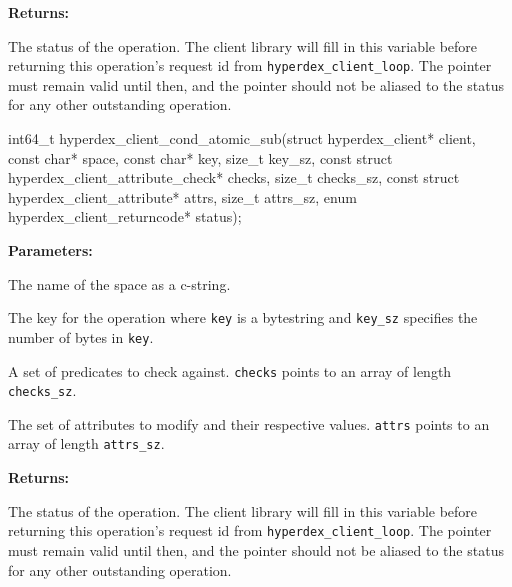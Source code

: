 \noindent\textbf{Returns:}
\begin{description}[labelindent=\widthof{{\texttt{status}}},leftmargin=*,noitemsep,nolistsep,align=right]
\item[\texttt{status}] The status of the operation.  The client library will fill in this variable before returning this operation's request id from \texttt{hyperdex\_client\_loop}.  The pointer must remain valid until then, and the pointer should not be aliased to the status for any other outstanding operation.
\end{description}

\funcsep
{}
\begin{ccode}
int64_t hyperdex_client_cond_atomic_sub(struct hyperdex_client* client,
                const char* space,
                const char* key, size_t key_sz,
                const struct hyperdex_client_attribute_check* checks, size_t checks_sz,
                const struct hyperdex_client_attribute* attrs, size_t attrs_sz,
                enum hyperdex_client_returncode* status);
\end{ccode}
\funcdesc 

\noindent\textbf{Parameters:}
\begin{description}[labelindent=\widthof{{\texttt{checks}, \texttt{checks\_sz}}},leftmargin=*,noitemsep,nolistsep,align=right]
\item[\texttt{space}] The name of the space as a c-string.
\item[\texttt{key}, \texttt{key\_sz}] The key for the operation where \texttt{key} is a bytestring and \texttt{key\_sz} specifies the number of bytes in \texttt{key}.
\item[\texttt{checks}, \texttt{checks\_sz}] A set of predicates to check against.  \texttt{checks} points to an array of length \texttt{checks\_sz}.
\item[\texttt{attrs}, \texttt{attrs\_sz}] The set of attributes to modify and their respective values.  \texttt{attrs} points to an array of length \texttt{attrs\_sz}.
\end{description}

\noindent\textbf{Returns:}
\begin{description}[labelindent=\widthof{{\texttt{status}}},leftmargin=*,noitemsep,nolistsep,align=right]
\item[\texttt{status}] The status of the operation.  The client library will fill in this variable before returning this operation's request id from \texttt{hyperdex\_client\_loop}.  The pointer must remain valid until then, and the pointer should not be aliased to the status for any other outstanding operation.
\end{description}

